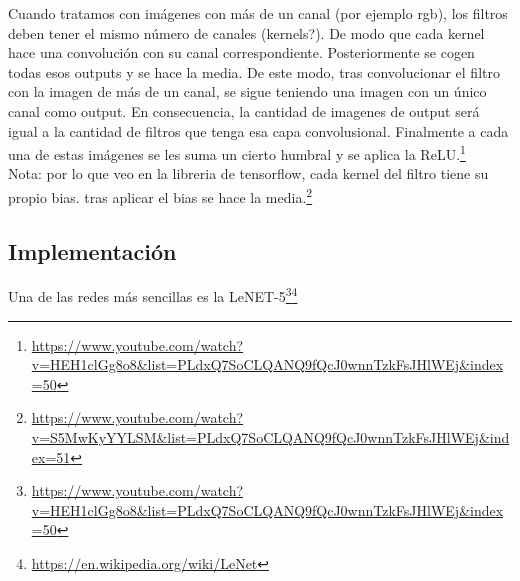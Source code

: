 \documentclass{article}
\begin{document}
Cuando tratamos con imágenes con más de un canal (por ejemplo rgb), los filtros deben tener el  mismo número de canales (kernels?). De modo que cada kernel  hace una convolución con su canal correspondiente. Posteriormente se cogen todas esos outputs y se hace la media. De este modo, tras convolucionar el filtro con la imagen de más de un canal, se sigue teniendo una imagen con un único canal como output. En consecuencia, la cantidad de imagenes de output será igual a la cantidad de filtros que tenga esa capa convolusional. Finalmente a cada una de estas imágenes se les suma un cierto humbral y se aplica la ReLU.\footnote{\url{https://www.youtube.com/watch?v=HEH1clGg8o8&list=PLdxQ7SoCLQANQ9fQcJ0wnnTzkFsJHlWEj&index=50}}\\

Nota: por lo que veo en la libreria de tensorflow, cada kernel del filtro tiene su propio bias. tras aplicar el bias se hace la media.\footnote{\url{https://www.youtube.com/watch?v=S5MwKyYYLSM&list=PLdxQ7SoCLQANQ9fQcJ0wnnTzkFsJHlWEj&index=51}}

\subsection{Implementación}
Una de las redes más sencillas es la LeNET-5\footnote{\url{https://www.youtube.com/watch?v=HEH1clGg8o8&list=PLdxQ7SoCLQANQ9fQcJ0wnnTzkFsJHlWEj&index=50}}\footnote{\url{https://en.wikipedia.org/wiki/LeNet}}
\end{document}
